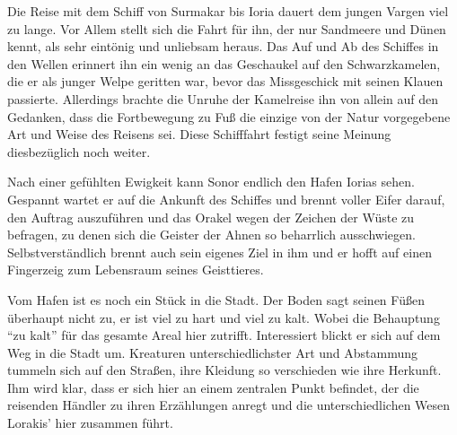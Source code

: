 Die Reise mit dem Schiff von Surmakar bis Ioria dauert dem jungen Vargen viel zu lange. 
Vor Allem stellt sich die Fahrt für ihn, der nur Sandmeere und Dünen kennt, als sehr eintönig und unliebsam heraus.
Das Auf und Ab des Schiffes in den Wellen erinnert ihn ein wenig an das Geschaukel auf den Schwarzkamelen, die er als junger Welpe geritten war, bevor das Missgeschick mit seinen Klauen passierte.
Allerdings brachte die Unruhe der Kamelreise ihn von allein auf den Gedanken, dass die Fortbewegung zu Fuß die einzige von der Natur vorgegebene Art und Weise des Reisens sei.
Diese Schifffahrt festigt seine Meinung diesbezüglich noch weiter.
 
Nach einer gefühlten Ewigkeit kann Sonor endlich den Hafen Iorias sehen.
Gespannt wartet er auf die Ankunft des Schiffes und brennt voller Eifer darauf, den Auftrag auszuführen und das Orakel wegen der Zeichen der Wüste zu befragen, zu denen sich die Geister der Ahnen so beharrlich ausschwiegen. Selbstverständlich brennt auch sein eigenes Ziel in ihm und er hofft auf einen Fingerzeig zum Lebensraum seines Geisttieres.

Vom Hafen ist es noch ein Stück in die Stadt. Der Boden sagt seinen Füßen überhaupt nicht zu, er ist viel zu hart und viel zu kalt. 
Wobei die Behauptung \enquote{zu kalt} für das gesamte Areal hier zutrifft.
Interessiert blickt er sich auf dem Weg in die Stadt um. Kreaturen unterschiedlichster Art und Abstammung tummeln sich auf den Straßen, ihre Kleidung so verschieden wie ihre Herkunft. Ihm wird klar, dass er sich hier an einem zentralen Punkt befindet, der die reisenden Händler zu ihren Erzählungen anregt und die unterschiedlichen Wesen Lorakis' hier zusammen führt. 